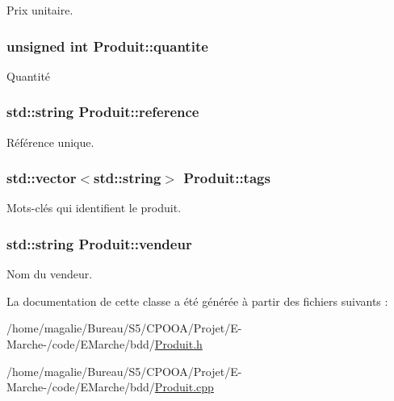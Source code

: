 Prix unitaire. 

\hypertarget{class_produit_a6c569e4c47aed9ee050bb0aa9455dd62}{
\subsubsection[{quantite}]{\setlength{\rightskip}{0pt plus 5cm}unsigned int Produit\-::quantite\hspace{0.3cm}{\ttfamily [protected]}}}\label{class_produit_a6c569e4c47aed9ee050bb0aa9455dd62}


Quantité 

\hypertarget{class_produit_a373d0a18812023e675ae981ca9618209}{
\subsubsection[{reference}]{\setlength{\rightskip}{0pt plus 5cm}std\-::string Produit\-::reference\hspace{0.3cm}{\ttfamily [protected]}}}\label{class_produit_a373d0a18812023e675ae981ca9618209}


Référence unique. 

\hypertarget{class_produit_a0fe989b845422996d650da8e5cc09fcf}{
\subsubsection[{tags}]{\setlength{\rightskip}{0pt plus 5cm}std\-::vector$<$std\-::string$>$ Produit\-::tags\hspace{0.3cm}{\ttfamily [protected]}}}\label{class_produit_a0fe989b845422996d650da8e5cc09fcf}


Mots-\/clés qui identifient le produit. 

\hypertarget{class_produit_a176eb59190cd9b761814fd5c68a8353b}{
\subsubsection[{vendeur}]{\setlength{\rightskip}{0pt plus 5cm}std\-::string Produit\-::vendeur\hspace{0.3cm}{\ttfamily [protected]}}}\label{class_produit_a176eb59190cd9b761814fd5c68a8353b}


Nom du vendeur. 



La documentation de cette classe a été générée à partir des fichiers suivants \-:\begin{DoxyCompactItemize}
\item 
/home/magalie/\-Bureau/\-S5/\-C\-P\-O\-O\-A/\-Projet/\-E-\/\-Marche-\//code/\-E\-Marche/bdd/\hyperlink{_produit_8h}{Produit.\-h}\item 
/home/magalie/\-Bureau/\-S5/\-C\-P\-O\-O\-A/\-Projet/\-E-\/\-Marche-\//code/\-E\-Marche/bdd/\hyperlink{_produit_8cpp}{Produit.\-cpp}\end{DoxyCompactItemize}
